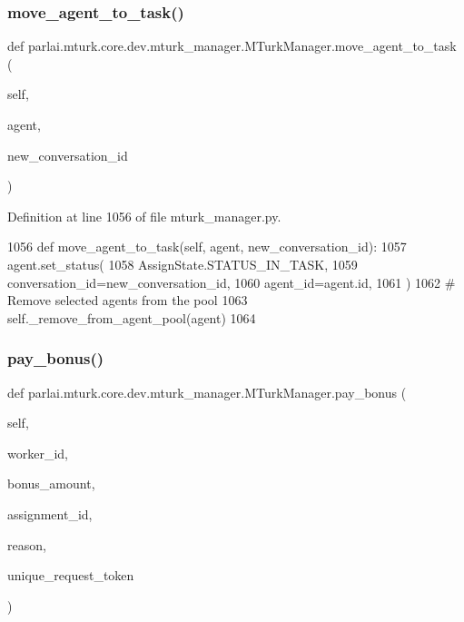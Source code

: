 \subsubsection{\texorpdfstring{move\+\_\+agent\+\_\+to\+\_\+task()}{move\_agent\_to\_task()}}
{\footnotesize\ttfamily def parlai.\+mturk.\+core.\+dev.\+mturk\+\_\+manager.\+M\+Turk\+Manager.\+move\+\_\+agent\+\_\+to\+\_\+task (\begin{DoxyParamCaption}\item[{}]{self,  }\item[{}]{agent,  }\item[{}]{new\+\_\+conversation\+\_\+id }\end{DoxyParamCaption})}



Definition at line 1056 of file mturk\+\_\+manager.\+py.


\begin{DoxyCode}
1056     \textcolor{keyword}{def }move\_agent\_to\_task(self, agent, new\_conversation\_id):
1057         agent.set\_status(
1058             AssignState.STATUS\_IN\_TASK,
1059             conversation\_id=new\_conversation\_id,
1060             agent\_id=agent.id,
1061         )
1062         \textcolor{comment}{# Remove selected agents from the pool}
1063         self.\_remove\_from\_agent\_pool(agent)
1064 
\end{DoxyCode}
\mbox{\label{classparlai_1_1mturk_1_1core_1_1dev_1_1mturk__manager_1_1MTurkManager_aac90e7ff80cd6dc170c0b8fa0c21483d}} 
\subsubsection{\texorpdfstring{pay\+\_\+bonus()}{pay\_bonus()}}
{\footnotesize\ttfamily def parlai.\+mturk.\+core.\+dev.\+mturk\+\_\+manager.\+M\+Turk\+Manager.\+pay\+\_\+bonus (\begin{DoxyParamCaption}\item[{}]{self,  }\item[{}]{worker\+\_\+id,  }\item[{}]{bonus\+\_\+amount,  }\item[{}]{assignment\+\_\+id,  }\item[{}]{reason,  }\item[{}]{unique\+\_\+request\+\_\+token }\end{DoxyParamCaption})}

